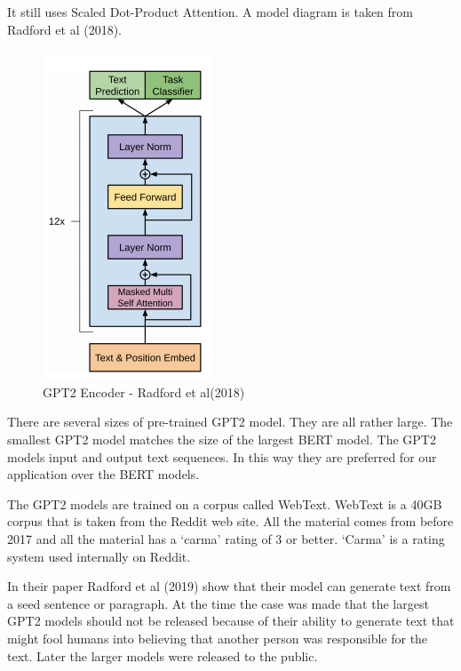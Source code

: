 It still uses Scaled Dot-Product Attention. A model diagram is taken from Radford et al (2018)\cite{radford2018improving}.

\begin{figure}[H]
	\begin{center}
		
		
		\includegraphics[scale=4.0]{diagram-mat05}
	\end{center}
	\caption[GPT2 Encoder]{GPT2 Encoder - Radford et al(2018)\cite{radford2018improving}}
	
\end{figure}

There are several sizes of pre-trained GPT2 model. They are all rather large. The smallest GPT2 model matches the size of the largest BERT model. The GPT2 models input and output text sequences. In this way they are preferred for our application over the BERT models. 


The GPT2 models are trained on a corpus called WebText. WebText is a 40GB corpus that is taken from the Reddit web site. All the material comes from before 2017 and all the material has a `carma' rating of 3 or better. `Carma' is a rating system used internally on Reddit. 

In their paper Radford et al (2019)\cite{radford2019language} show that their model can generate text from a seed sentence or paragraph. At the time the case was made that the largest GPT2 models should not be released because of their ability to generate text that might fool humans into believing that another person was responsible for the text. Later the larger models were released to the public.

